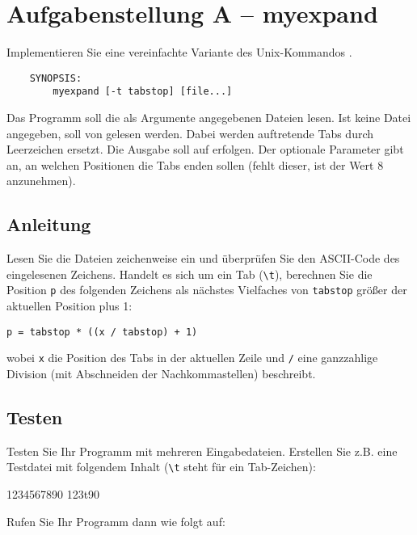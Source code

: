 




\section*{Aufgabenstellung A -- myexpand}
Implementieren Sie eine vereinfachte Variante des Unix-Kommandos
.
\begin{verbatim}
    SYNOPSIS:
        myexpand [-t tabstop] [file...]
\end{verbatim}

Das Programm  soll die als Argumente angegebenen Dateien
lesen. Ist keine Datei angegeben, soll von  gelesen werden.
Dabei werden auftretende Tabs durch Leerzeichen ersetzt. Die Ausgabe
soll auf  erfolgen. Der optionale Parameter 
gibt an, an welchen Positionen die Tabs enden sollen (fehlt dieser,
ist der Wert 8 anzunehmen).

\subsection*{Anleitung}
Lesen Sie die Dateien zeichenweise ein und überprüfen Sie den
ASCII-Code des eingelesenen Zeichens. Handelt es sich um ein Tab
(\verb|\t|), berechnen Sie die Position \verb|p| des folgenden
Zeichens als nächstes Vielfaches von \verb|tabstop| größer der
aktuellen Position plus 1:

\verb|p = tabstop * ((x / tabstop) + 1)|

wobei \verb|x| die Position des Tabs in der aktuellen Zeile und
\verb|/| eine ganzzahlige Division (mit Abschneiden der
Nachkommastellen) beschreibt.

\subsection*{Testen}
Testen Sie Ihr Programm mit mehreren Eingabedateien. Erstellen Sie
z.B. eine Testdatei  mit folgendem Inhalt (\verb|\t| steht für
ein Tab-Zeichen):

\begin{osuefmtcode}
	1234567890
	123\bslash{}t90
\end{osuefmtcode}

Rufen Sie Ihr Programm dann wie folgt auf:


\osueguidelinesone


